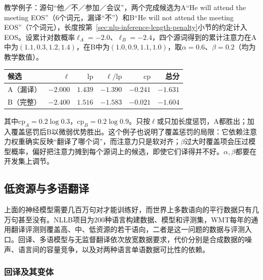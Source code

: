 教学例子：源句“他／不／参加／会议”，两个完成候选为A“He will attend the meeting EOS”（6个词元，漏译“不”）和B“He will not attend the meeting EOS”（7个词元），长度按第~\ref{sec:nlp-inference-length-penalty}小节的约定计入EOS。设累计对数概率$\ell_A=-2.0$、$\ell_B=-2.4$，四个源词得到的累计注意力在A中为$(1.1,0.3,1.2,1.4)$，在B中为$(1.0,0.9,1.1,1.0)$，取$\alpha=0.6$、$\beta=0.2$（均为教学数值）。
\begin{center}
  \begin{tabular}{@{}lrrrrr@{}}
    \toprule
    候选 & $\ell$ & $\mathrm{lp}$ & $\ell/\mathrm{lp}$ & $\mathrm{cp}$ & 总分\\
    \midrule
    A（漏译） & $-2.000$ & $1.439$ & $-1.390$ & $-0.241$ & $-1.631$\\
    B（完整） & $-2.400$ & $1.516$ & $-1.583$ & $-0.021$ & $-1.604$\\
    \bottomrule
  \end{tabular}
\end{center}
其中$\mathrm{cp}_A=0.2\log0.3$，$\mathrm{cp}_B=0.2\log0.9$。只按$\ell$或只加长度惩罚，A都胜出；加入覆盖惩罚后B以微弱优势胜出。这个例子也说明了覆盖惩罚的局限：它依赖注意力权重确实反映“翻译了哪个词”，而注意力只是软对齐；$\beta$过大时覆盖项会压过模型概率，偏好把注意力摊到每个源词上的候选，即使它们译得并不好。$\alpha,\beta$都要在开发集上调节。

\subsection{低资源与多语翻译}
\label{sec:nlp-generation-low-resource-mt}

上面的神经模型需要几百万句对才能训练好，而世界上多数语向的平行数据只有几万句甚至没有。NLLB项目为200种语言构建数据、模型和评测集，WMT每年的通用翻译评测则覆盖高、中、低资源的若干语向，二者是这一问题的数据与评测入口\cite{nlp-intro-nllb2022,nlp-intro-kocmi2024}。回译、多语模型与无监督翻译依次放宽数据要求，代价分别是合成数据的噪声、语言间的容量竞争，以及对两种语言单语数据可比性的依赖。

\subsubsection{回译及其变体}
\label{sec:nlp-generation-back-translation}

